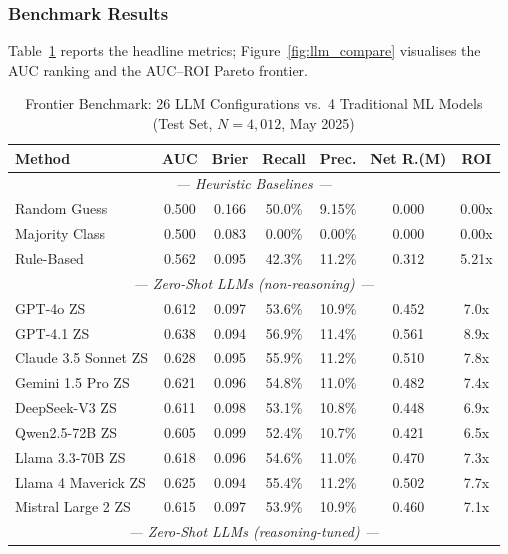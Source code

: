 \documentclass[12pt, a4paper]{article}
\begin{document}
\subsubsection{Benchmark Results}

Table~\ref{tab:llm_vs_ml} reports the headline metrics; Figure~\ref{fig:llm_compare} visualises the AUC ranking and the AUC--ROI Pareto frontier.

\begin{table}[H]
\centering
\caption{Frontier Benchmark: 26 LLM Configurations vs.\ 4 Traditional ML Models (Test Set, $N=4{,}012$, May 2025)}
\label{tab:llm_vs_ml}
\scriptsize
\renewcommand{\arraystretch}{1.10}
\begin{tabular}{@{}lcccccc@{}}
\toprule
\textbf{Method} & \textbf{AUC} & \textbf{Brier} & \textbf{Recall} & \textbf{Prec.} & \textbf{Net R.(M)} & \textbf{ROI}\\
\midrule
\multicolumn{7}{c}{\textit{--- Heuristic Baselines ---}}\\
Random Guess          & 0.500 & 0.166 & 50.0\% & 9.15\% & 0.000 & 0.00x\\
Majority Class        & 0.500 & 0.083 & 0.00\% & 0.00\% & 0.000 & 0.00x\\
Rule-Based            & 0.562 & 0.095 & 42.3\% & 11.2\% & 0.312 & 5.21x\\
\midrule
\multicolumn{7}{c}{\textit{--- Zero-Shot LLMs (non-reasoning) ---}}\\
GPT-4o ZS              & 0.612 & 0.097 & 53.6\% & 10.9\% & 0.452 & 7.0x\\
GPT-4.1 ZS             & 0.638 & 0.094 & 56.9\% & 11.4\% & 0.561 & 8.9x\\
Claude 3.5 Sonnet ZS    & 0.628 & 0.095 & 55.9\% & 11.2\% & 0.510 & 7.8x\\
Gemini 1.5 Pro ZS       & 0.621 & 0.096 & 54.8\% & 11.0\% & 0.482 & 7.4x\\
DeepSeek-V3 ZS         & 0.611 & 0.098 & 53.1\% & 10.8\% & 0.448 & 6.9x\\
Qwen2.5-72B ZS         & 0.605 & 0.099 & 52.4\% & 10.7\% & 0.421 & 6.5x\\
Llama 3.3-70B ZS         & 0.618 & 0.096 & 54.6\% & 11.0\% & 0.470 & 7.3x\\
Llama 4 Maverick ZS      & 0.625 & 0.094 & 55.4\% & 11.2\% & 0.502 & 7.7x\\
Mistral Large 2 ZS       & 0.615 & 0.097 & 53.9\% & 10.9\% & 0.460 & 7.1x\\
\midrule
\multicolumn{7}{c}{\textit{--- Zero-Shot LLMs (reasoning-tuned) ---}}\\

\end{tabular}
\end{table}
\end{document}
